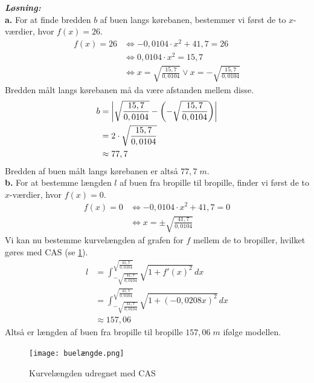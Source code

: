 \documentclass{article}
\newcommand{\sol}{\setlength{\parindent}{0cm}\textbf{\textit{Løsning:}}\setlength{\parindent}{1cm}}
\begin{document}
\sol \\
\textbf{a.}
For at finde bredden $b$ af buen langs kørebanen, bestemmer vi først de to $x$-værdier, hvor $f(x)= 26$.
\begin{equation*}
\begin{split}
  f(x)= 26 &\iff -0,0104 \cdot x^2 +41,7 =26\\
  &\iff 0,0104 \cdot x^2 = 15,7\\
  &\iff x=\sqrt{\frac{15,7}{0,0104}} \lor x=- \sqrt{\frac{15,7}{0,0104}} 
\end{split}
\end{equation*}
Bredden målt langs kørebanen må da være afstanden mellem disse.
\begin{equation*}
\begin{split}
  b&=\abs{\sqrt{\frac{15,7}{0,0104}} -\left(- \sqrt{\frac{15,7}{0,0104}} \right) } \\
  &=2 \cdot \sqrt{\frac{15,7}{0,0104}} \\
  &\approx 77,7
\end{split}
\end{equation*}
Bredden af buen målt langs kørebanen er altså $77,7 \;\unit{m} $.\\[1ex]
\textbf{b.}
For at bestemme længden $l$ af buen fra bropille til bropille, finder vi først de to $x$-værdier, hvor $f(x)= 0$. 
\begin{equation*}
\begin{split}
  f(x)= 0 &\iff -0,0104 \cdot x^2 +41,7 =0\\
  &\iff x=\pm \sqrt{\frac{41,7}{0,0104}} 
\end{split}
\end{equation*}
Vi kan nu bestemme kurvelængden af grafen for $f$ mellem de to bropiller, hvilket gøres med CAS (se \cref{fig:buelængde}).
\begin{equation*}
\begin{split}
  l&=\int_{-\sqrt{\frac{41,7}{0,0104}} }^{\sqrt{\frac{41,7}{0,0104}} } \sqrt{1+f'(x)^2}  \,dx\\
  &=\int_{-\sqrt{\frac{41,7}{0,0104}} }^{\sqrt{\frac{41,7}{0,0104}} } \sqrt{1+\left(-0,0208x\right) ^2}  \,dx\\
  &\approx 157,06
\end{split}
\end{equation*}
Altså er længden af buen fra bropille til bropille $157,06 \;\unit{m} $ ifølge modellen. 
\begin{figure}[H]
\begin{center}
  \texttt{[image: buelængde.png]}
\end{center}
\caption{Kurvelængden udregnet med CAS}
\label{fig:buelængde}
\end{figure}
\end{document}
